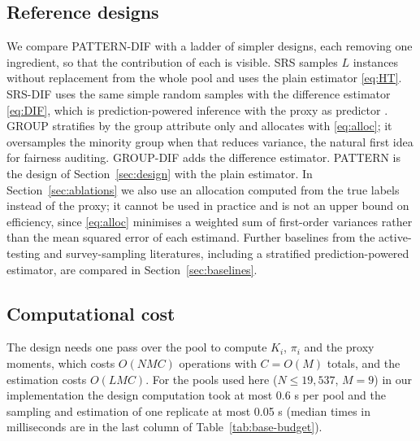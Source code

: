 \subsection{Reference designs}
We compare PATTERN-DIF with a ladder of simpler designs, each removing one ingredient, so that the contribution of each is visible. SRS samples $L$ instances without replacement from the whole pool and uses the plain estimator \eqref{eq:HT}. SRS-DIF uses the same simple random samples with the difference estimator \eqref{eq:DIF}, which is prediction-powered inference with the proxy as predictor \citep{angelopoulos2023ppi}. GROUP stratifies by the group attribute only and allocates with \eqref{eq:alloc}; it oversamples the minority group when that reduces variance, the natural first idea for fairness auditing. GROUP-DIF adds the difference estimator. PATTERN is the design of Section~\ref{sec:design} with the plain estimator. In Section~\ref{sec:ablations} we also use an allocation computed from the true labels instead of the proxy; it cannot be used in practice and is not an upper bound on efficiency, since \eqref{eq:alloc} minimises a weighted sum of first-order variances rather than the mean squared error of each estimand. Further baselines from the active-testing and survey-sampling literatures, including a stratified prediction-powered estimator, are compared in Section~\ref{sec:baselines}.

\subsection{Computational cost}
The design needs one pass over the pool to compute $K_i$, $\pi_i$ and the proxy moments, which costs $O(NMC)$ operations with $C=O(M)$ totals, and the estimation costs $O(LMC)$. For the pools used here ($N\le 19{,}537$, $M=9$) in our implementation the design computation took at most 0.6 s per pool and the sampling and estimation of one replicate at most 0.05 s (median times in milliseconds are in the last column of Table~\ref{tab:base-budget}).
